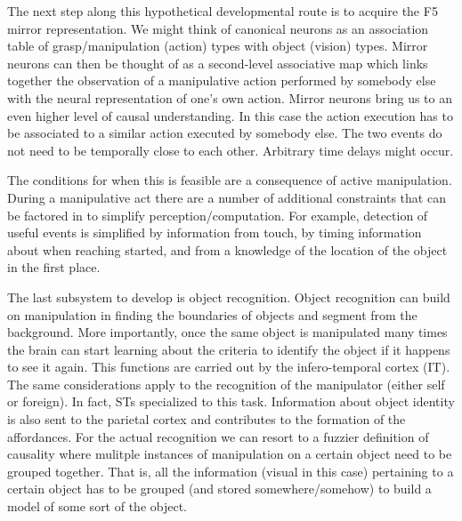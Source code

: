 The next step along this hypothetical developmental route is to 
acquire the F5 mirror representation. We might think of canonical neurons as
an association table of grasp/manipulation (action) types with object
(vision) types.  Mirror neurons can then be thought of as a 
second-level associative map which links together the observation of 
a manipulative action performed by somebody else with the neural 
representation of one's own action.
Mirror neurons bring us to an even higher level of causal 
understanding. In this case the action execution has to be associated
to a similar action executed by somebody else. The two events
do not need to be temporally close to each other. Arbitrary time delays
might occur.

The conditions for when this is feasible are a consequence of active
manipulation. During a manipulative act there are a number of
additional constraints that can be factored in to simplify
perception/computation.  For example, detection of useful events is
simplified by information from touch, by timing information 
about when
reaching started, and from a knowledge of the location of the object in
the first place.

The last subsystem to develop is object recognition. Object 
recognition can build on manipulation in finding the boundaries
of objects and segment from the background. More importantly,
once the same object is manipulated many times the brain can
start learning about the criteria to identify the object if 
it happens to see it again. This functions are
carried out by the infero-temporal cortex (IT).
The same considerations apply to the recognition of the 
manipulator (either self or foreign). In fact, STs specialized
to this task. Information about object identity is
also sent to the parietal cortex and contributes to 
the formation of the affordances. For the actual recognition we 
can resort to a fuzzier definition
of causality where mulitple instances of manipulation on a 
certain object need to be grouped together. That is, all the 
information (visual in this case) pertaining to a certain object
has to be grouped (and stored somewhere/somehow) to build a model of some sort
of the object.

